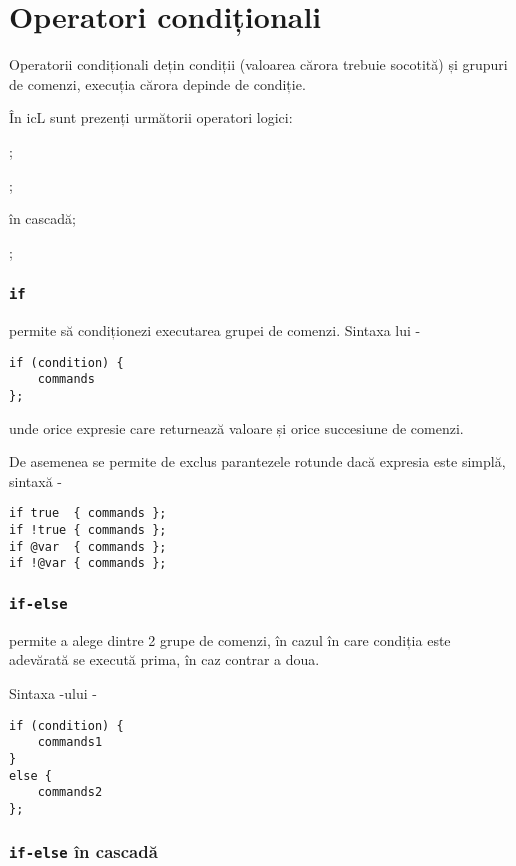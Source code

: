 \section{Operatori condiționali}

Operatorii condiționali dețin condiții (valoarea cărora trebuie socotită) și grupuri de comenzi, execuția cărora depinde de condiție.

În icL sunt prezenți următorii operatori logici:
\begin{icItems}
	\item {};
	\item {};
	\item {} în cascadă;
	\item {};
\end{icItems}

\subsubsection{\lstinline|if|}

 permite să condiționezi executarea grupei de comenzi. Sintaxa lui -
\begin{lstlisting}[numbers=none]
if (condition) {
	commands
};
\end{lstlisting}
unde  orice expresie care returnează valoare \bool{} și  orice succesiune de comenzi.

De asemenea se permite de exclus parantezele rotunde dacă expresia este simplă, sintaxă -
\begin{lstlisting}[numbers=none]
if true  { commands };
if !true { commands };
if @var  { commands };
if !@var { commands };
\end{lstlisting}

\subsubsection{\lstinline|if-else|}

 permite a alege dintre 2 grupe de comenzi, în cazul în care condiția este adevărată se execută prima, în caz contrar a doua.

Sintaxa -ului -
\begin{lstlisting}[numbers=none]
if (condition) {
	commands1
}
else {
	commands2
};
\end{lstlisting}

\subsubsection{\lstinline|if-else| în cascadă}

